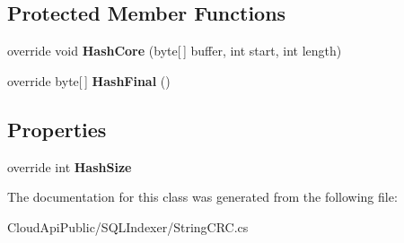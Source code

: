 \subsection*{Protected Member Functions}
\begin{DoxyCompactItemize}
\item 
\hypertarget{class_cloud_api_public_1_1_s_q_l_indexer_1_1_string_c_r_c_abec09c5f68c8f194f6e92103b00bd286}{override void {\bfseries Hash\-Core} (byte\mbox{[}$\,$\mbox{]} buffer, int start, int length)}\label{class_cloud_api_public_1_1_s_q_l_indexer_1_1_string_c_r_c_abec09c5f68c8f194f6e92103b00bd286}

\item 
\hypertarget{class_cloud_api_public_1_1_s_q_l_indexer_1_1_string_c_r_c_a07e5deaf7241c30af0ac3a597e720ea4}{override byte\mbox{[}$\,$\mbox{]} {\bfseries Hash\-Final} ()}\label{class_cloud_api_public_1_1_s_q_l_indexer_1_1_string_c_r_c_a07e5deaf7241c30af0ac3a597e720ea4}

\end{DoxyCompactItemize}
\subsection*{Properties}
\begin{DoxyCompactItemize}
\item 
\hypertarget{class_cloud_api_public_1_1_s_q_l_indexer_1_1_string_c_r_c_a61e3f166628c7c59407279c1668c11b3}{override int {\bfseries Hash\-Size}}\label{class_cloud_api_public_1_1_s_q_l_indexer_1_1_string_c_r_c_a61e3f166628c7c59407279c1668c11b3}

\end{DoxyCompactItemize}


The documentation for this class was generated from the following file\-:\begin{DoxyCompactItemize}
\item 
Cloud\-Api\-Public/\-S\-Q\-L\-Indexer/String\-C\-R\-C.\-cs\end{DoxyCompactItemize}
